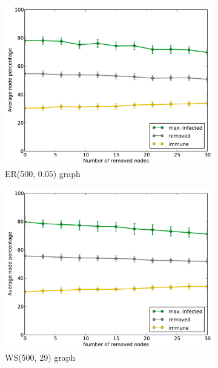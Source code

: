 \documentclass[11pt]{article} %
\begin{document}
\begin{figure}[tb]
  \begin{subfigure}[b]{0.5\textwidth}
    \centering
    \includegraphics[width=\textwidth]{figures/hubs_ER_500_005}
    \caption{ER(500, 0.05) graph}
  \end{subfigure}
  \begin{subfigure}[b]{0.5\textwidth}
    \centering
    \includegraphics[width=\textwidth]{figures/hubs_WS_500_29_01}
    \caption{WS(500, 29) graph}
  \end{subfigure}
  \begin{subfigure}[b]{0.5\textwidth}
    \centering

\end{subfigure}
\end{figure}
\end{document}
